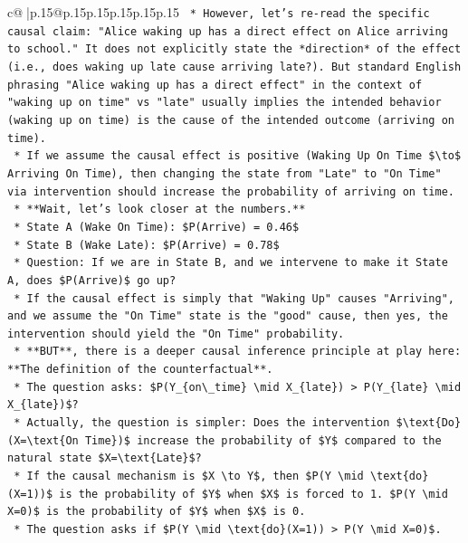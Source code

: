 \documentclass{article}
\begin{document}
{\begin{supertabular}{c@{$\;$}|p{.15\linewidth}@{}p{.15\linewidth}p{.15\linewidth}p{.15\linewidth}p{.15\linewidth}p{.15\linewidth}}
{{{\texttt{    *   However, let's re{-}read the specific causal claim: "Alice waking up has a direct effect on Alice arriving to school." It does not explicitly state the *direction* of the effect (i.e., does waking up late cause arriving late?). But standard English phrasing "Alice waking up has a direct effect" in the context of "waking up on time" vs "late" usually implies the intended behavior (waking up on time) is the cause of the intended outcome (arriving on time).} \\
\texttt{    *   If we assume the causal effect is positive (Waking Up On Time \$\textbackslash{}to\$ Arriving On Time), then changing the state from "Late" to "On Time" via intervention should increase the probability of arriving on time.} \\
\texttt{    *   **Wait, let's look closer at the numbers.**} \\
\texttt{        *   State A (Wake On Time): \$P(Arrive) = 0.46\$} \\
\texttt{        *   State B (Wake Late): \$P(Arrive) = 0.78\$} \\
\texttt{        *   Question: If we are in State B, and we intervene to make it State A, does \$P(Arrive)\$ go up?} \\
\texttt{        *   If the causal effect is simply that "Waking Up" causes "Arriving", and we assume the "On Time" state is the "good" cause, then yes, the intervention should yield the "On Time" probability.} \\
\texttt{        *   **BUT**, there is a deeper causal inference principle at play here: **The definition of the counterfactual**.} \\
\texttt{        *   The question asks: \$P(Y\_\{on\textbackslash{}\_time\} \textbackslash{}mid X\_\{late\}) > P(Y\_\{late\} \textbackslash{}mid X\_\{late\})\$?} \\
\texttt{        *   Actually, the question is simpler: Does the intervention \$\textbackslash{}text\{Do\}(X=\textbackslash{}text\{On Time\})\$ increase the probability of \$Y\$ compared to the natural state \$X=\textbackslash{}text\{Late\}\$?} \\
\texttt{        *   If the causal mechanism is \$X \textbackslash{}to Y\$, then \$P(Y \textbackslash{}mid \textbackslash{}text\{do\}(X=1))\$ is the probability of \$Y\$ when \$X\$ is forced to 1. \$P(Y \textbackslash{}mid X=0)\$ is the probability of \$Y\$ when \$X\$ is 0.} \\
\texttt{        *   The question asks if \$P(Y \textbackslash{}mid \textbackslash{}text\{do\}(X=1)) > P(Y \textbackslash{}mid X=0)\$.} \\
}}}
\end{supertabular}}
\end{document}

